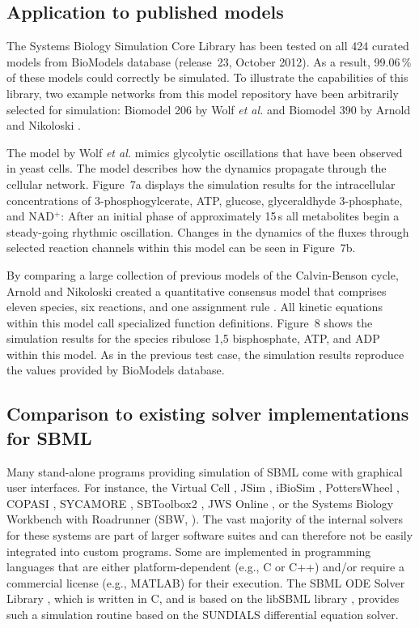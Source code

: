\documentclass[10pt]{bmc_article}
\newenvironment{bmcformat}{\baselineskip20pt\sloppy\setboolean{publ}{false}}{\baselineskip20pt\sloppy}
\begin{document}
\begin{bmcformat}
\subsection*{Application to published models}

The Systems Biology Simulation Core Library has been tested on all 424 curated models from BioModels database \cite{Novere2006a} (release~23, October 2012).
As a result, 99.06\,\% of these models could correctly be simulated.
To illustrate the capabilities of this library, two example networks from this model repository have been arbitrarily selected for simulation:
Biomodel 206 by Wolf \emph{et al.} \cite{Wolf2000} and Biomodel 390 by Arnold and Nikoloski \cite{Arnold2011}.

The model by Wolf \emph{et al.} \cite{Wolf2000} mimics glycolytic oscillations that have been observed in yeast cells.
The model describes how the dynamics propagate through the cellular network. Figure~7a displays the simulation results
for the intracellular concentrations of 3-phosphogylcerate, ATP, glucose, glyceraldhyde 3-phosphate, and NAD$^+$:
After an initial phase of approximately 15\,s all metabolites begin a steady-going rhythmic oscillation.
Changes in the dynamics of the fluxes through selected reaction channels within this model can be seen in Figure~7b. 

By comparing a large collection of previous models of the Calvin-Benson
cycle, Arnold and Nikoloski created a quantitative consensus model that
comprises eleven species, six reactions, and one assignment rule \cite{Arnold2011}.
All kinetic equations within this model call specialized function definitions.
Figure~8 shows the simulation results for the species ribulose 1,5 bisphosphate, ATP,  and ADP within this model.
As in the previous test case, the simulation results reproduce the values provided by BioModels database.  

\subsection*{Comparison to existing solver implementations for SBML}

Many stand-alone programs providing simulation of SBML come with graphical user interfaces.
For instance, the Virtual Cell \cite{Loew2001}, JSim \cite{Beard2012a}, iBioSim \cite{Myers2009},
PottersWheel \cite{Maiwald2008}, COPASI \cite{Hoops2006}, SYCAMORE \cite{Weidemann2008}, SBToolbox2
\cite{SBT_Schmidt2006}, JWS Online \cite{Olivier2004}, or the Systems Biology Workbench with Roadrunner (SBW, \cite{Bergmann06}). 
The vast majority of the internal solvers for these systems are part of
larger software suites and can therefore not be easily integrated into custom
programs. Some are implemented in programming languages that are either
platform-dependent (e.g., C or C++) and/or require a commercial license (e.g.,
MATLAB\texttrademark{}) for their execution.
The SBML ODE Solver Library \cite{Machne2006}, which is written in C,
and is based on the libSBML library \cite{Bornstein2008}, 
provides such a simulation routine based on the SUNDIALS differential equation
solver.


\end{bmcformat}
\end{document}
